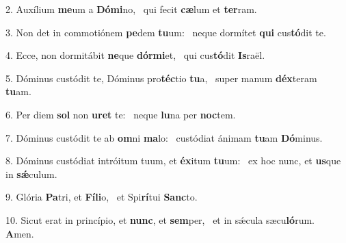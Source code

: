 2. Auxílium \textbf{me}um a \textbf{Dó}\textbf{mi}no, \ast\  qui fecit \textbf{cæ}lum et \textbf{ter}ram.\

3. Non det in commotiónem \textbf{pe}dem \textbf{tu}um: \ast\  neque dormítet \textbf{qui} cus\textbf{tó}dit te.\

4. Ecce, non dormitábit \textbf{ne}que \textbf{dór}\textbf{mi}et, \ast\  qui cus\textbf{tó}dit \textbf{Is}raël.\

5. Dóminus custódit te, Dóminus pro\textbf{téc}tio \textbf{tu}a, \ast\  super manum \textbf{déx}teram \textbf{tu}am.\

6. Per diem \textbf{sol} non \textbf{u}\textbf{ret} te: \ast\  neque \textbf{lu}na per \textbf{noc}tem.\

7. Dóminus custódit te ab \textbf{om}ni \textbf{ma}lo: \ast\  custódiat ánimam \textbf{tu}am \textbf{Dó}minus.\

8. Dóminus custódiat intróitum tuum, et \textbf{éx}itum \textbf{tu}um: \ast\  ex hoc nunc, et \textbf{us}que in \textbf{sǽ}culum.\

9. Glória \textbf{Pa}tri, et \textbf{Fí}\textbf{li}o, \ast\  et Spi\textbf{rí}tui \textbf{Sanc}to.\

10. Sicut erat in princípio, et \textbf{nunc}, et \textbf{sem}per, \ast\  et in sǽcula sæcu\textbf{ló}rum. \textbf{A}men.\


